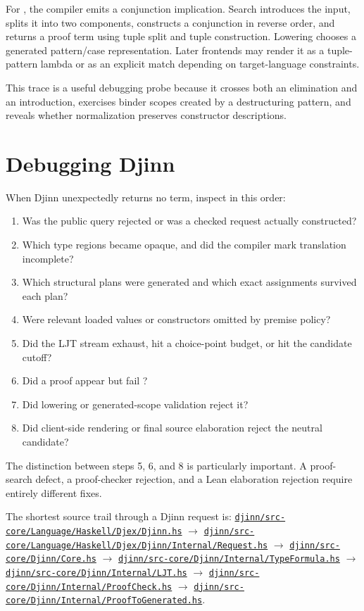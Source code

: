 \documentclass[10pt,letterpaper,oneside]{report}
\newcommand{\code}[1]{\texttt{\detokenize{#1}}}
\def\DjexBase{https://github.com/VladimirReshetnikov/Djex/blob/e454757d53ec057238c22fc6cd0d935b7d96b3dc/}
\newcommand{\dpath}[1]{\href{\DjexBase#1}{\nolinkurl{#1}}}
\begin{document}
For \code{(a,b) -> (b,a)}, the compiler emits a conjunction implication. Search introduces the input, splits it into two components, constructs a conjunction in reverse order, and returns a proof term using tuple split and tuple construction. Lowering chooses a generated pattern/case representation. Later frontends may render it as a tuple-pattern lambda or as an explicit match depending on target-language constraints.

This trace is a useful debugging probe because it crosses both an elimination and an introduction, exercises binder scopes created by a destructuring pattern, and reveals whether normalization preserves constructor descriptions.

\section{Debugging Djinn}

When Djinn unexpectedly returns no term, inspect in this order:

\begin{enumerate}
  \item Was the public query rejected or was a checked request actually constructed?
  \item Which type regions became opaque, and did the compiler mark translation incomplete?
  \item Which structural plans were generated and which exact assignments survived each plan?
  \item Were relevant loaded values or constructors omitted by premise policy?
  \item Did the LJT stream exhaust, hit a choice-point budget, or hit the candidate cutoff?
  \item Did a proof appear but fail \code{ProofCheck}?
  \item Did lowering or generated-scope validation reject it?
  \item Did client-side rendering or final source elaboration reject the neutral candidate?
\end{enumerate}

The distinction between steps 5, 6, and 8 is particularly important. A proof-search defect, a proof-checker rejection, and a Lean elaboration rejection require entirely different fixes.

\begin{sourcebox}
The shortest source trail through a Djinn request is: \dpath{djinn/src-core/Language/Haskell/Djex/Djinn.hs} $\rightarrow$ \dpath{djinn/src-core/Language/Haskell/Djex/Djinn/Internal/Request.hs} $\rightarrow$ \dpath{djinn/src-core/Djinn/Core.hs} $\rightarrow$ \dpath{djinn/src-core/Djinn/Internal/TypeFormula.hs} $\rightarrow$ \dpath{djinn/src-core/Djinn/Internal/LJT.hs} $\rightarrow$ \dpath{djinn/src-core/Djinn/Internal/ProofCheck.hs} $\rightarrow$ \dpath{djinn/src-core/Djinn/Internal/ProofToGenerated.hs}.
\end{sourcebox}
\end{document}

